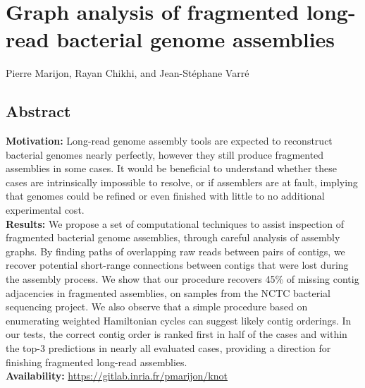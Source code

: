 \documentclass[./main.tex]{subfiles}
\newcommand{\modafterreview}[1]{#1}
\begin{document}

\section{Graph analysis of fragmented long-read bacterial genome assemblies}

Pierre Marijon, Rayan Chikhi, and Jean-St\'ephane Varr\'e\

\subsection{Abstract}
\textbf{Motivation:} Long-read genome assembly tools are expected to reconstruct bacterial genomes nearly perfectly, however they still produce fragmented assemblies in some cases. %
It would be beneficial to understand whether these cases are intrinsically impossible to resolve, or if assemblers are at fault, implying that genomes could be refined or even finished with little to no additional experimental cost. \\
%
\textbf{Results:}  We propose a set of \modafterreview{computational} techniques to assist inspection of fragmented bacterial genome assemblies, through careful analysis of assembly graphs. %
By finding paths of overlapping raw reads between pairs of contigs, we recover potential short-range connections between contigs that were lost during the assembly process.  We show that our procedure recovers \modafterreview{45\% of missing contig adjacencies} in fragmented \canu assemblies, on samples from the NCTC bacterial sequencing project.
We also observe that a simple procedure based on enumerating weighted Hamiltonian cycles can suggest likely contig orderings. In our tests, the correct contig order is ranked first in half of the cases and within the top-3 predictions in \modafterreview{nearly all evaluated} cases, providing a direction for finishing fragmented long-read assemblies.\\

\textbf{Availability:} \url{https://gitlab.inria.fr/pmarijon/knot}\\
\end{document}
